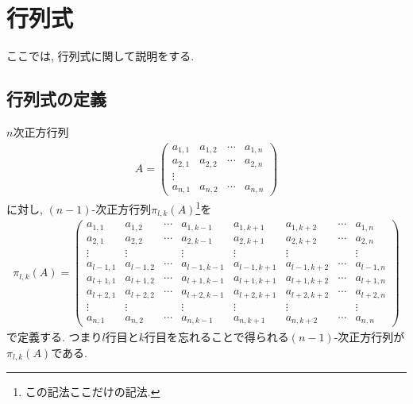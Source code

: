 \chapter{行列式}
\label{chap:det}
ここでは,
行列式に関して説明をする.


\section{行列式の定義}

$n$次正方行列
 \begin{align*}
  A=
  \begin{pmatrix}
    a_{1,1}&a_{1,2}&\cdots&a_{1,n}\\
    a_{2,1}&a_{2,2}&\cdots&a_{2,n}\\
    \vdots\\
    a_{n,1}&a_{n,2}&\cdots&a_{n,n}
  \end{pmatrix}
  \end{align*}
  に対し,
  $(n-1)$-次正方行列$\pi_{l,k}(A)$\footnote{この記法ここだけの記法.}を
  \begin{align*}
    \pi_{l,k}(A)=
    \left(
  \begin{array}{cccc|cccc}
    a_{1,1}&a_{1,2}&\cdots&a_{1,k-1}&a_{1,k+1}&a_{1,k+2}&\cdots&a_{1,n}\\
    a_{2,1}&a_{2,2}&\cdots&a_{2,k-1}&a_{2,k+1}&a_{2,k+2}&\cdots&a_{2,n}\\
    \vdots&\vdots&&\vdots&\vdots&\vdots&&\vdots\\
    a_{l-1,1}&a_{l-1,2}&\cdots&a_{l-1,k-1}&a_{l-1,k+1}&a_{l-1,k+2}&\cdots&a_{l-1,n}\\\hline
    a_{l+1,1}&a_{l+1,2}&\cdots&a_{l+1,k-1}&a_{l+1,k+1}&a_{l+1,k+2}&\cdots&a_{l+1,n}\\
    a_{l+2,1}&a_{l+2,2}&\cdots&a_{l+2,k-1}&a_{l+2,k+1}&a_{l+2,k+2}&\cdots&a_{l+2,n}\\
    \vdots&\vdots&&\vdots&\vdots&\vdots&&\vdots\\
    a_{n,1}&a_{n,2}&\cdots&a_{n,k-1}&a_{n,k+1}&a_{n,k+2}&\cdots&a_{n,n}
  \end{array}
  \right)
\end{align*}
  で定義する.
  つまり$l$行目と$k$行目を忘れることで得られる$(n-1)$-次正方行列が$\pi_{l,k}(A)$である.


